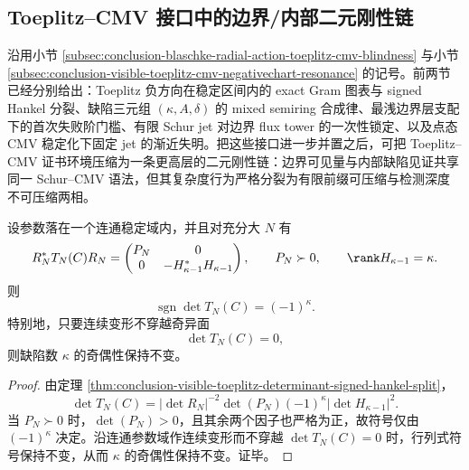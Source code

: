 \subsection{Toeplitz--CMV 接口中的边界/内部二元刚性链}\label{subsec:conclusion-toeplitz-cmv-boundary-internal-binary-rigidity}
沿用小节 \ref{subsec:conclusion-blaschke-radial-action-toeplitz-cmv-blindness} 与小节 \ref{subsec:conclusion-visible-toeplitz-cmv-negativechart-resonance} 的记号。前两节已经分别给出：Toeplitz 负方向在稳定区间内的 exact Gram 图表与 signed Hankel 分裂、缺陷三元组 \((\kappa,A,\delta)\) 的 mixed semiring 合成律、最浅边界层支配下的首次失败阶门槛、有限 Schur jet 对边界 flux tower 的一次性锁定、以及点态 CMV 稳定化下固定 jet 的渐近失明。把这些接口进一步并置之后，可把 Toeplitz--CMV 证书环境压缩为一条更高层的二元刚性链：边界可见量与内部缺陷见证共享同一 Schur--CMV 语法，但其复杂度行为严格分裂为有限前缀可压缩与检测深度不可压缩两相。

\begin{corollary}\label{cor:conclusion-toeplitz-negative-parity-local-rigidity}
设参数落在一个连通稳定域内，并且对充分大 \(N\) 有
\[
R_N^*T_N(C)R_N=
\begin{pmatrix}
P_N & 0\\
0 & -H_{\kappa-1}^*H_{\kappa-1}
\end{pmatrix},
\qquad
P_N\succ 0,
\qquad
\rank H_{\kappa-1}=\kappa.
\]
则
\[
\operatorname{sgn}\det T_N(C)=(-1)^\kappa.
\]
特别地，只要连续变形不穿越奇异面
\[
\det T_N(C)=0,
\]
则缺陷数 \(\kappa\) 的奇偶性保持不变。
\end{corollary}
\begin{proof}
由定理 \ref{thm:conclusion-visible-toeplitz-determinant-signed-hankel-split}，
\[
\det T_N(C)
=
|\det R_N|^{-2}\det(P_N)(-1)^\kappa |\det H_{\kappa-1}|^2.
\]
当 \(P_N\succ 0\) 时，\(\det(P_N)>0\)，且其余两个因子也严格为正，故符号仅由 \((-1)^\kappa\) 决定。沿连通参数域作连续变形而不穿越 \(\det T_N(C)=0\) 时，行列式符号保持不变，从而 \(\kappa\) 的奇偶性保持不变。证毕。
\end{proof}

